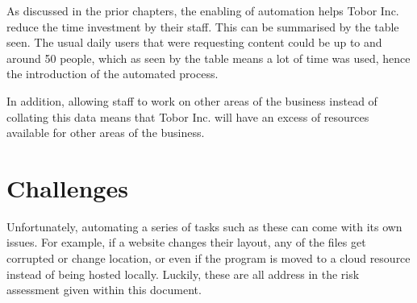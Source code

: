 \documentclass[12]{article}
\begin{document}
As discussed in the prior chapters, the enabling of automation helps Tobor Inc. reduce the time investment by their staff. This can be summarised by the table seen. The usual daily users that were requesting content could be up to and around 50 people, which as seen by the table means a lot of time was used, hence the introduction of the automated process.

In addition, allowing staff to work on other areas of the business instead of collating this data means that Tobor Inc. will have an excess of resources available for other areas of the business.

\section{Challenges}

Unfortunately, automating a series of tasks such as these can come with its own issues. For example, if a website changes their layout, any of the files get corrupted or change location, or even if the program is moved to a cloud resource instead of being hosted locally. Luckily, these are all address in the risk assessment given within this document.
\end{document}
